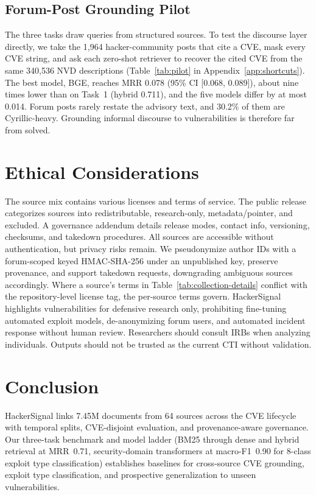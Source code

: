 \documentclass{article}
\begin{document}
\subsection{Forum-Post Grounding Pilot}
\label{sec:pilot}

The three tasks draw queries from structured sources. To test the discourse layer directly, we take the 1,964 hacker-community posts that cite a CVE, mask every CVE string, and ask each zero-shot retriever to recover the cited CVE from the same 340,536 NVD descriptions (Table~\ref{tab:pilot} in Appendix~\ref{app:shortcuts}). The best model, BGE, reaches MRR 0.078 (95\% CI [0.068, 0.089]), about nine times lower than on Task~1 (hybrid 0.711), and the five models differ by at most 0.014. Forum posts rarely restate the advisory text, and 30.2\% of them are Cyrillic-heavy. Grounding informal discourse to vulnerabilities is therefore far from solved.

\section{Ethical Considerations}
\label{sec:ethics}

The source mix contains various licenses and terms of service. The public release categorizes sources into redistributable, research-only, metadata/pointer, and excluded. A governance addendum details release modes, contact info, versioning, checksums, and takedown procedures. All sources are accessible without authentication, but privacy risks remain. We pseudonymize author IDs with a forum-scoped keyed HMAC-SHA-256 under an unpublished key, preserve provenance, and support takedown requests, downgrading ambiguous sources accordingly.
Where a source's terms in Table~\ref{tab:collection-details} conflict with the repository-level license tag, the per-source terms govern. HackerSignal highlights vulnerabilities for defensive research only, prohibiting fine-tuning automated exploit models, de-anonymizing forum users, and automated incident response without human review. Researchers should consult IRBs when analyzing individuals. Outputs should not be trusted as the current CTI without validation.

\section{Conclusion}
\label{sec:discussion}

HackerSignal links 7.45M documents from 64 sources across the CVE lifecycle with temporal splits, CVE-disjoint evaluation, and provenance-aware governance. Our three-task benchmark and model ladder (BM25 through dense and hybrid retrieval at MRR~0.71, security-domain transformers at macro-F1~0.90 for 8-class exploit type classification) establishes baselines for cross-source CVE grounding, exploit type classification, and prospective generalization to unseen vulnerabilities.
\end{document}
